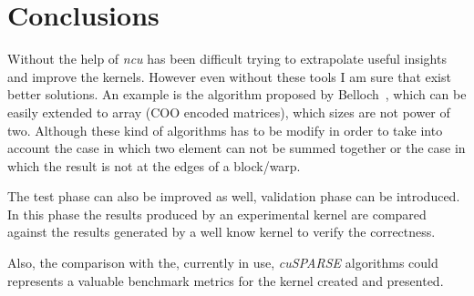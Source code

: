 \documentclass[conference]{IEEEtran}
\begin{document}
\section{Conclusions}
Without the help of \emph{ncu} has been difficult trying to extrapolate useful insights and improve the kernels. However even without these tools I am sure that exist better solutions. An example is the algorithm proposed by Belloch~\cite{blelloch1990vector}, which can be easily extended to array (COO encoded matrices), which sizes are not power of two. Although these kind of algorithms has to be modify in order to take into account the case in which two element can not be summed together or the case in which the result is not at the edges of a block/warp.

The test phase can also be improved as well, validation phase can be introduced. In this phase the results produced by an experimental kernel are compared against the results generated by a well know kernel to verify the correctness.

Also, the comparison with the, currently in use, \emph{cuSPARSE} algorithms could represents a valuable benchmark metrics for the kernel created and presented.


\end{document}

